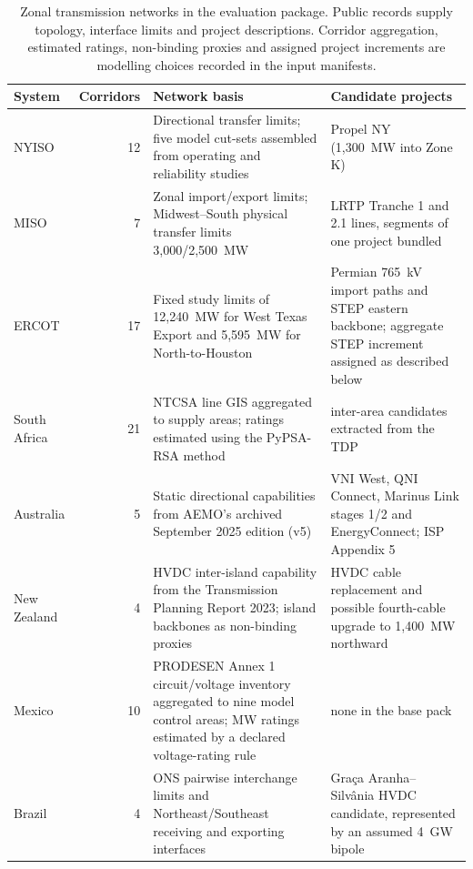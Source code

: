 \documentclass[pdflatex,sn-nature]{sn-jnl}
\begin{document}
\begin{table}[tbp]
\caption{Zonal transmission networks in the evaluation package. Public records supply topology, interface limits and project descriptions. Corridor aggregation, estimated ratings, non-binding proxies and assigned project increments are modelling choices recorded in the input manifests.}
\label{tab:networks}
\centering\small
\begin{tabularx}{\textwidth}{@{}lr>{\raggedright\arraybackslash}X>{\raggedright\arraybackslash}X@{}}
\toprule
System & Corridors & Network basis & Candidate projects \\
\midrule
NYISO & 12 & Directional transfer limits; five model cut-sets assembled from operating and reliability studies & Propel NY (1,300~MW into Zone K) \\
MISO & 7 & Zonal import/export limits; Midwest--South physical transfer limits 3,000/2,500~MW & LRTP Tranche 1 and 2.1 lines, segments of one project bundled \\
ERCOT & 17 & Fixed study limits of 12,240~MW for West Texas Export and 5,595~MW for North-to-Houston & Permian 765~kV import paths and STEP eastern backbone; aggregate STEP increment assigned as described below \\
South Africa & 21 & NTCSA line GIS aggregated to supply areas; ratings estimated using the PyPSA-RSA method\cite{pypsarsa,horsch2017pypsaza} & 31 inter-area candidates extracted from the TDP \\
Australia & 5 & Static directional capabilities from AEMO's archived September 2025 edition (v5) & VNI West, QNI Connect, Marinus Link stages 1/2 and EnergyConnect; ISP Appendix 5 \\
New Zealand & 4 & HVDC inter-island capability from the Transmission Planning Report 2023; island backbones as non-binding proxies & HVDC cable replacement and possible fourth-cable upgrade to 1,400~MW northward \\
Mexico & 10 & PRODESEN Annex 1 circuit/voltage inventory aggregated to nine model control areas; MW ratings estimated by a declared voltage-rating rule & none in the base pack \\
Brazil & 4 & ONS pairwise interchange limits and Northeast/Southeast receiving and exporting interfaces & Gra\c{c}a Aranha--Silv\^ania HVDC candidate, represented by an assumed 4~GW bipole \\
\bottomrule
\end{tabularx}
\end{table}
\end{document}
